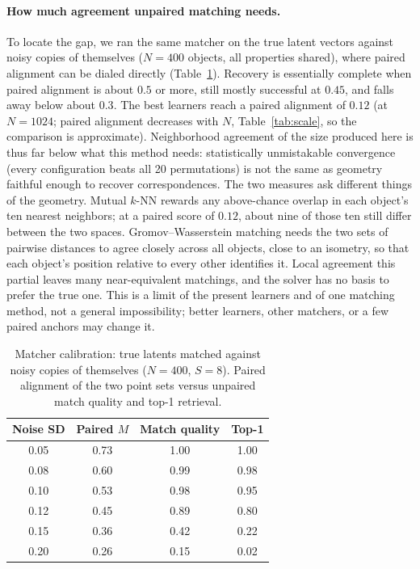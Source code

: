 \documentclass[11pt]{article}
\begin{document}
\paragraph{How much agreement unpaired matching needs.} To locate the gap, we ran the same matcher on the true latent vectors against noisy copies of themselves ($N=400$ objects, all properties shared), where paired alignment can be dialed directly (Table~\ref{tab:calib}). Recovery is essentially complete when paired alignment is about $0.5$ or more, still mostly successful at $0.45$, and falls away below about $0.3$. The best learners reach a paired alignment of $0.12$ (at $N=1024$; paired alignment decreases with $N$, Table~\ref{tab:scale}, so the comparison is approximate). Neighborhood agreement of the size produced here is thus far below what this method needs: statistically unmistakable convergence (every configuration beats all 20 permutations) is not the same as geometry faithful enough to recover correspondences. The two measures ask different things of the geometry. Mutual $k$-NN rewards any above-chance overlap in each object's ten nearest neighbors; at a paired score of $0.12$, about nine of those ten still differ between the two spaces. Gromov--Wasserstein matching needs the two sets of pairwise distances to agree closely across all objects, close to an isometry, so that each object's position relative to every other identifies it. Local agreement this partial leaves many near-equivalent matchings, and the solver has no basis to prefer the true one. This is a limit of the present learners and of one matching method, not a general impossibility; better learners, other matchers, or a few paired anchors may change it.

\begin{table}[t]
  \centering
  \small
  \caption{Matcher calibration: true latents matched against noisy copies of themselves ($N=400$, $S=8$). Paired alignment of the two point sets versus unpaired match quality and top-1 retrieval.}
  \label{tab:calib}
  \begin{tabular}{cccc}
    \toprule
    Noise SD & Paired $M$ & Match quality & Top-1 \\
    \midrule
    0.05 & 0.73 & 1.00 & 1.00 \\
    0.08 & 0.60 & 0.99 & 0.98 \\
    0.10 & 0.53 & 0.98 & 0.95 \\
    0.12 & 0.45 & 0.89 & 0.80 \\
    0.15 & 0.36 & 0.42 & 0.22 \\
    0.20 & 0.26 & 0.15 & 0.02 \\
    \bottomrule
  \end{tabular}
\end{table}
\end{document}
